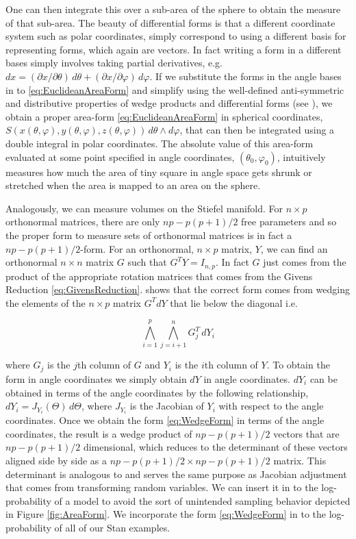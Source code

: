 \documentclass{article}
\begin{document}
One can then integrate this over a sub-area of the sphere to obtain the measure of that sub-area. The beauty of differential forms is that a different coordinate system such as polar coordinates, simply correspond to using a different basis for representing forms, which again are vectors. In fact writing a form in a different bases simply involves taking partial derivatives, e.g. $dx = (\partial x/\partial \theta) \, d\theta + (\partial x/ \partial \varphi) \, d\varphi$. If we substitute the forms in the angle bases in to \ref{eq:EuclideanAreaForm} and simplify using the well-defined anti-symmetric and distributive properties of wedge products and differential forms (see \citep{muirhead2009aspects}), we obtain a proper area-form \ref{eq:EuclideanAreaForm} in spherical coordinates, $S(x(\theta, \varphi),y(\theta, \varphi),z(\theta, \varphi))\, d\theta \wedge d\varphi$, that can then be integrated using a double integral in polar coordinates. The absolute value of this area-form evaluated at some point specified in angle coordinates, $(\theta_0, \varphi_0)$, intuitively measures how much the area of tiny square in angle space gets shrunk or stretched when the area is mapped to an area on the sphere.

Analogously, we can measure volumes on the Stiefel manifold. For $n \times p$ orthonormal matrices, there are only $np-p(p+1)/2$ free parameters and so the proper form to measure sets of orthonormal matrices is in fact a $np-p(p+1)/2$-form. For an orthonormal, $n \times p$ matrix, $Y$, we can find an orthonormal $n \times n$ matrix $G$ such that $G^T Y = I_{n,p}$. In fact $G$ just comes from the product of the appropriate rotation matrices that comes from the Givens Reduction \ref{eq:GivensReduction}. \citet{muirhead2009aspects} shows that the correct form comes from wedging the elements of the $n \times p$ matrix $G^T dY$ that lie below the diagonal i.e.

\begin{equation}
\label{eq:WedgeForm}
\bigwedge_{i=1}^p \bigwedge_{j=i+1}^n G_j^T\, dY_i
\end{equation}

where $G_j$ is the $j$th column of $G$ and $Y_i$ is the $i$th column of $Y$. To obtain the form in angle coordinates we simply obtain $dY$ in angle coordinates. $dY_i$ can be obtained in terms of the angle coordinates by the following relationship, $dY_i = J_{Y_i}(\Theta)\, d\Theta$, where $J_{Y_i}$ is the Jacobian of $Y_i$ with respect to the angle coordinates. Once we obtain the form \ref{eq:WedgeForm} in terms of the angle coordinates, the result is a wedge product of $np-p(p+1)/2$ vectors that are $np-p(p+1)/2$ dimensional, which reduces to the determinant of these vectors aligned side by side as a $np-p(p+1)/2 \times np-p(p+1)/2$ matrix. This determinant is analogous to and serves the same purpose as Jacobian adjustment that comes from transforming random variables. We can insert it in to the log-probability of a model to avoid the sort of unintended sampling behavior depicted in Figure \ref{fig:AreaForm}. We incorporate the form \ref{eq:WedgeForm} in to the log-probability of all of our Stan examples.
\end{document}
